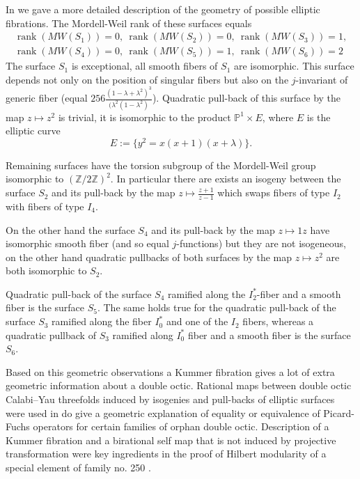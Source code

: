 \documentclass[12pt]{amsart}
\theoremstyle{plain}
\theoremstyle{remark}
\theoremstyle{definition}
\newcommand{\PP}{\mathbb P}
\newcommand\ZZ{{\mathbb Z}}
\numberwithin{table}{section}
\begin{document}
In \cite{CK-C} we gave a more detailed description of the geometry of possible elliptic fibrations. The Mordell-Weil rank of these surfaces equals
\begin{gather*}
	\operatorname{rank}(MW(S_{1})) = 0, \
	\operatorname{rank}(MW(S_{2})) = 0, \
	\operatorname{rank}(MW(S_{3})) = 1, \\
	\operatorname{rank}(MW(S_{4})) = 0, \
	\operatorname{rank}(MW(S_{5})) = 1, \
	\operatorname{rank}(MW(S_{6})) = 2
\end{gather*}
The surface $S_{1}$ is exceptional, all smooth fibers of $S_{1}$ are isomorphic. This surface depends not only on the position of singular fibers but also on the $j$-invariant of generic fiber (equal $256\frac{(1-\lambda+\lambda^{2})^{3}}{(\lambda^{2}(1-\lambda^{2})}$).
Quadratic pull-back of this surface by the map $z\mapsto z^{2}$ is trivial, it is isomorphic to the product $\PP^{1}\times E$, where $E$ is the elliptic curve
\[E:=\{y^{2}=x(x+1)(x+\lambda)\}.\]

Remaining surfaces have the torsion subgroup of the Mordell-Weil group isomorphic to $(\ZZ/2\ZZ)^{2}$. In particular there are exists an isogeny between the surface $S_{2}$ and its pull-back by the map $z\mapsto \frac{z+1}{z-1}$ which swaps fibers of type $I_{2}$ with fibers of type $I_{4}$.

On the other hand the surface $S_{4}$ and its pull-back by the map $z\mapsto 1z$ have isomorphic smooth fiber (and so equal $j$-functions) but they are not isogeneous, on the other hand quadratic pullbacks of both surfaces by the map $z\mapsto z^{2}$ are both isomorphic to $S_{2}$.

Quadratic pull-back of the surface $S_{4}$ ramified along the $I_{2}^{*}$-fiber and a smooth fiber is the surface $S_{5}$. The same holds true for the quadratic pull-back of the surface $S_{3}$ ramified along the fiber $I_{0}^{*}$ and one of the $I_{2}$ fibers, whereas a quadratic pullback of $S_{3}$ ramified along $I_{0}^{*}$ fiber and a smooth fiber is the surface $S_{6}$.



Based on this geometric observations a Kummer fibration gives a lot of extra geometric information about a double octic.
Rational maps between double octic Calabi--Yau threefolds induced by isogenies and pull-backs of elliptic surfaces were used in \cite{CvS} do give a geometric explanation of equality or equivalence of Picard-Fuchs operators for certain families of orphan double octic.
Description of a Kummer fibration and a birational self map that is not induced by projective transformation were key ingredients in the proof of Hilbert modularity of a special element of family no. 250 \cite{CScvS}.
\end{document}
